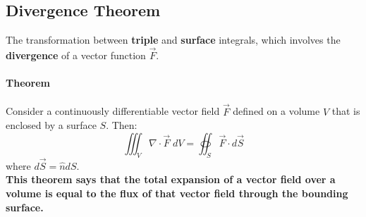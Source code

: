 \documentclass[11pt]{article}
\begin{document}
            \subsection{Divergence Theorem}\label{subsec:divergence-theorem}
                The transformation between \textbf{triple} and \textbf{surface} integrals, which involves the \textbf{divergence} of a vector function $\vec{F}$.
                \paragraph{Theorem} Consider a continuously differentiable vector field $\vec{F}$ defined on a volume $V$ that is enclosed by a surface $S$.
                Then:
                \begin{equation}
                    \label{eq:equation11}
                    \iiint_{V} \nabla \cdot \vec{F} \; dV = \oiint_{S} \vec{F} \cdot d\vec{S}
                \end{equation}
                where $d\vec{S} = \hat{n} dS$.\\
            \textbf{This theorem says that the total expansion of a vector field over a volume is equal to the flux
            of that vector field through the bounding surface.}
\end{document}
